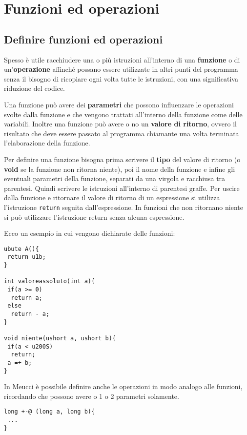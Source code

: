 \documentclass[10pt]{book}%
\newcommand{\e}{\`{e} }
\newcommand{\ac}[1]{\`{#1}}
\newcommand{\code}[1]{\texttt{#1}}
\renewcommand{\emph}[1]{\textbf{#1}}
\newenvironment{codeenv}{
\begin{mdframed}[backgroundcolor=black!20,topline=false,leftline=false,rightline=false,bottomline=false]
}
{\end{mdframed}}
\begin{document}
\chapter{Funzioni ed operazioni}
\section{Definire funzioni ed operazioni}
Spesso \e utile racchiudere una o pi\ac u istruzioni all'interno di una \emph{funzione} o di un'\emph{operazione} affinch\'e possano essere utilizzate in altri punti del programma senza il bisogno di ricopiare ogni volta tutte le istruzioni, con una significativa riduzione del codice.

Una funzione pu\ac o avere dei \emph{parametri} che possono influenzare le operazioni svolte dalla funzione e che vengono trattati all'interno della funzione come delle variabili. Inoltre una funzione pu\ac o avere o no un \emph{valore di ritorno}, ovvero il risultato che deve essere passato al programma chiamante una volta terminata l'elaborazione della funzione.

Per definire una funzione bisogna prima scrivere il \emph{tipo} del valore di ritorno (o \emph{void} se la funzione non ritorna niente), poi il nome della funzione e infine gli eventuali parametri della funzione, separati da una virgola e racchiusa tra parentesi. Quindi scrivere le istruzioni all'interno di parentesi graffe. Per uscire dalla funzione e ritornare il valore di ritorno di un espressione si utilizza l'istruzione \code{return} seguita dall'espressione. In funzioni che non ritornano niente si pu\ac o utilizzare l'istruzione return senza alcuna espressione.

Ecco un esempio in cui vengono dichiarate delle funzioni:

\begin{codeenv}
\begin{verbatim}
ubute A(){
 return u1b;
}

int valoreassoluto(int a){
 if(a >= 0)
  return a;
 else
  return - a;
}

void niente(ushort a, ushort b){
 if(a < u200S)
  return;
 a =+ b;
}
\end{verbatim}
\end{codeenv}

In Meucci \e possibile definire anche le operazioni in modo analogo alle funzioni, ricordando che possono avere o 1 o 2 parametri solamente.
\begin{codeenv}
\begin{verbatim}
long +-@ (long a, long b){
 ...
}
\end{verbatim}
\end{codeenv}
\end{document}
